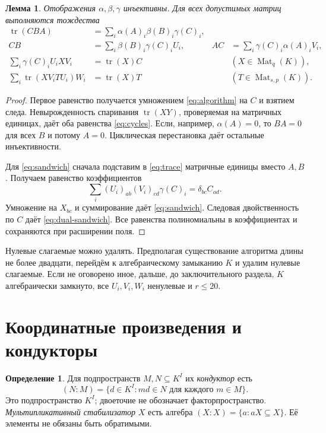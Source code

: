 \documentclass[11pt,a4paper]{article}
\numberwithin{equation}{section}
\theoremstyle{plain}
\newtheorem{lemma}[theorem]{Лемма}
\theoremstyle{definition}
\newtheorem{definition}[theorem]{Определение}
\DeclareMathOperator{\tr}{tr}\DeclareMathOperator{\rk}{rk}
\DeclareMathOperator{\Mat}{Mat}\DeclareMathOperator{\Span}{span}
\newcommand{\leqs}{\leqslant}\newcommand{\geqs}{\geqslant}
\begin{document}
\begin{lemma}\label{lem:identities}
Отображения $\alpha,\beta,\gamma$ инъективны. Для всех допустимых матриц
выполняются тождества
\begin{align}
 \tr(CBA)&=\sum_i\alpha(A)_i\beta(B)_i\gamma(C)_i,\label{eq:trace}\\
 CB&=\sum_i\beta(B)_i\gamma(C)_iU_i,&
 AC&=\sum_i\gamma(C)_i\alpha(A)_iV_i,\label{eq:cycles}\\
 \sum_i\gamma(C)_i U_i X V_i&=\tr(X)C
       &&(X\in\Mat_q(K)),\label{eq:sandwich}\\
 \sum_i\tr(XV_iTU_i)W_i&=\tr(X)T
       &&(T\in\Mat_{s,p}(K)).\label{eq:dual-sandwich}
\end{align}
\end{lemma}
\begin{proof}
Первое равенство получается умножением \eqref{eq:algorithm} на $C$ и
взятием следа. Невырожденность спаривания $\tr(XY)$, проверяемая на
матричных единицах, даёт оба равенства \eqref{eq:cycles}.
Если, например, $\alpha(A)=0$, то $BA=0$ для всех $B$ и потому $A=0$.
Циклическая перестановка даёт остальные инъективности.

Для \eqref{eq:sandwich} сначала подставим в \eqref{eq:trace} матричные
единицы вместо $A,B$. Получаем равенство коэффициентов
\[
 \sum_i(U_i)_{a b}(V_i)_{c d}\gamma(C)_i
       =\delta_{bc}C_{ad}.
\]
Умножение на $X_{bc}$ и суммирование даёт \eqref{eq:sandwich}.
Следовая двойственность по $C$ даёт \eqref{eq:dual-sandwich}.
Все равенства полиномиальны в коэффициентах и сохраняются при расширении поля.
\end{proof}

Нулевые слагаемые можно удалять. Предполагая существование алгоритма
длины не более двадцати, перейдём к алгебраическому замыканию $K$ и удалим
нулевые слагаемые. Если не оговорено иное, дальше, до заключительного
раздела, $K$ алгебраически замкнуто, все $U_i,V_i,W_i$ ненулевые
и $r\leqs20$.

\section{Координатные произведения и кондукторы}

\begin{definition}
Для подпространств $M,N\subseteq K^I$ их \emph{кондуктор} есть
\[
 (N:M)=\{d\in K^I:md\in N\text{ для каждого }m\in M\}.
\]
Это подпространство $K^I$; двоеточие не обозначает факторпространство.
\emph{Мультипликативный стабилизатор} $X$ есть алгебра
$(X:X)=\{a:aX\subseteq X\}$. Её элементы не обязаны быть обратимыми.
\end{definition}
\end{document}
